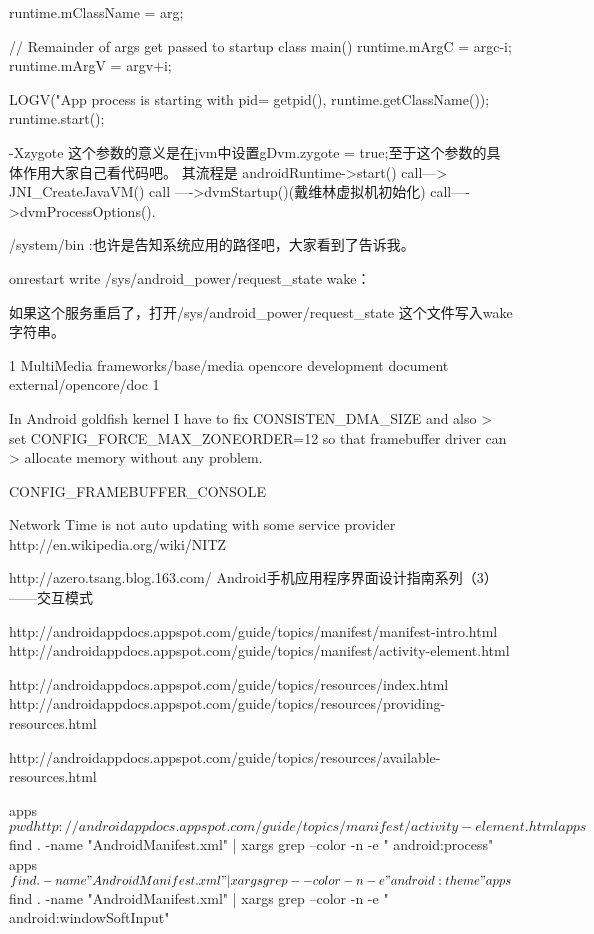 \documentclass{book}
\begin{document}
\begin{CJK}{UTF8}{gbsn}
{{{            runtime.mClassName = arg;

            // Remainder of args get passed to startup class main()
            runtime.mArgC = argc-i;
            runtime.mArgV = argv+i;

            LOGV("App process is starting with pid=%
                 getpid(), runtime.getClassName());
            runtime.start();
        }
    }

-Xzygote 这个参数的意义是在jvm中设置gDvm.zygote = true;至于这个参数的具体作用大家自己看代码吧。 其流程是 androidRuntime->start() call---> JNI_CreateJavaVM() call ---->dvmStartup()(戴维林虚拟机初始化) call---->dvmProcessOptions().

/system/bin :也许是告知系统应用的路径吧，大家看到了告诉我。

onrestart write /sys/android_power/request_state wake：

如果这个服务重启了，打开/sys/android_power/request_state 这个文件写入wake字符串。

{{{1
MultiMedia
frameworks/base/media
opencore development document
external/opencore/doc
}}}1



In Android goldfish kernel I have to fix CONSISTEN_DMA_SIZE and also
> set CONFIG_FORCE_MAX_ZONEORDER=12 so that framebuffer driver can
> allocate memory without any problem.

CONFIG_FRAMEBUFFER_CONSOLE 







Network Time is not auto updating with some service provider
http://en.wikipedia.org/wiki/NITZ

http://azero.tsang.blog.163.com/
Android手机应用程序界面设计指南系列（3）——交互模式 



http://androidappdocs.appspot.com/guide/topics/manifest/manifest-intro.html
http://androidappdocs.appspot.com/guide/topics/manifest/activity-element.html

http://androidappdocs.appspot.com/guide/topics/resources/index.html
http://androidappdocs.appspot.com/guide/topics/resources/providing-resources.html

http://androidappdocs.appspot.com/guide/topics/resources/available-resources.html

apps$pwd

http://androidappdocs.appspot.com/guide/topics/manifest/activity-element.html
apps$ find . -name "AndroidManifest.xml" | xargs grep --color -n -e " android:process"
apps$ find . -name "AndroidManifest.xml" | xargs grep --color -n -e " android:theme"
apps$ find . -name "AndroidManifest.xml" | xargs grep --color -n -e " android:windowSoftInput"

}
\end{CJK}
\end{document}
